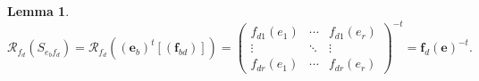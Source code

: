 \documentclass[aps,preprint]{revtex4}
\newtheorem{lemma}[theorem]{Lemma}
\begin{document}
\begin{lemma}
\begin{equation}
\mathcal{R}_{f_{d}}\left( S_{e_{b}f_{d}}\right) =\mathcal{R}_{f_{d}}\left( 
\overset{}{\left( \boldsymbol{e}_{b}\right) ^{t}\left[ \left( \boldsymbol{f}%
_{bd}\right) \right] }\right) =\left( 
\begin{array}{ccc}
f_{d1}\left( e_{1}\right) & \cdots & f_{d1}\left( e_{r}\right) \\ 
\vdots & \ddots & \vdots \\ 
f_{dr}\left( e_{1}\right) & \cdots & f_{dr}\left( e_{r}\right)%
\end{array}%
\right) ^{-t}=\boldsymbol{f}_{d}\left( \boldsymbol{e}\right) ^{-t}.
\end{equation}
\end{lemma}
\end{document}
